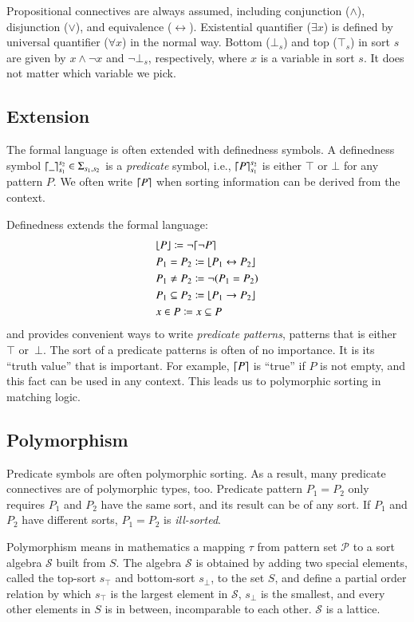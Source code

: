 \documentclass{article}
\theoremstyle{plain}
\DeclarePairedDelimiter\ceil{\lceil}{\rceil}
\DeclarePairedDelimiter\floor{\lfloor}{\rfloor}
\begin{document}
Propositional connectives are always assumed, including conjunction ($\wedge$), disjunction ($\vee$), and equivalence ($\leftrightarrow$). Existential quantifier ($\exists x$) is defined by universal quantifier ($\forall x$) in the normal way. Bottom ($\bot_s$) and top ($\top_s$) in sort $s$ are given by $x \wedge \neg x$ and $\neg \bot_s$, respectively, where $x$ is a variable in sort $s$. It does not matter which variable we pick.

\subsection{Extension}
The formal language is often extended with definedness symbols. A definedness symbol $\ceil*{\_}_{s_1}^{s_2} \in \Sigma_{s_1,s_2}$ is a \emph{predicate} symbol, i.e., $\ceil*{P}_{s_1}^{s_2}$ is either $\top$ or $\bot$ for any pattern $P$. We often write $\ceil*{P}$ when sorting information can be derived from the context.

Definedness extends the formal language:
\begin{align*}
&\floor*{P} \coloneqq {\neg} \ceil*{\neg P} \\
&P_1 = P_2 \coloneqq \floor*{P_1 \leftrightarrow P_2} \\
&P_1 \neq P_2 \coloneqq \neg (P_1 = P_2) \\
&P_1 \subseteq P_2 \coloneqq \floor*{P_1 \to P_2} \\
&x \in P \coloneqq x \subseteq P
\end{align*}
and provides convenient ways to write \emph{predicate patterns}, patterns that is either $\top$ or~$\bot$. The sort of a predicate patterns is often of no importance. It is its ``truth value'' that is important. For example, $\ceil*{P}$ is ``true'' if $P$ is not empty, and this fact can be used in any context. This leads us to polymorphic sorting in matching logic.

\subsection{Polymorphism}
Predicate symbols are often polymorphic sorting. As a result, many predicate connectives are of polymorphic types, too. Predicate pattern $P_1 = P_2$ only requires $P_1$ and $P_2$ have the same sort, and its result can be of any sort. If $P_1$ and $P_2$ have different sorts, $P_1 = P_2$ is \emph{ill-sorted}.

Polymorphism means in mathematics a mapping $\tau$ from pattern set $\mathcal{P}$ to a sort algebra $\mathcal{S}$ built from $S$. The algebra $\mathcal{S}$ is obtained by adding two special elements, called the top-sort $s_\top$ and bottom-sort $s_\bot$, to the set $S$, and define a partial order relation by which $s_\top$ is the largest element in $\mathcal{S}$, $s_\bot$ is the smallest, and every other elements in $S$ is in between, incomparable to each other. $\mathcal{S}$ is a lattice.
\end{document}
